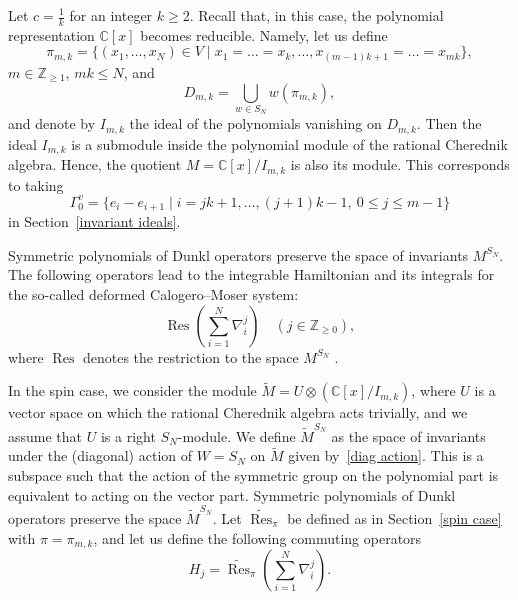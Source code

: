 \documentclass[12pt]{amsart}
\newcommand{\Z}{\mathbb Z}
\DeclareMathOperator{\Res}{Res}
\numberwithin{equation}{section}
\theoremstyle{definition}
\begin{document}
Let $c = \frac{1}{k}$ for an integer $k \geq 2$. Recall that, in this case, the polynomial representation $\mathbb{C}[x]$ becomes reducible. Namely, let us define 
\begin{equation*}
    \pi_{m,k} = \{(x_1, \dots, x_N) \in V \mid x_{1}= \dots = x_{k},  \ldots ,  x_{(m-1)k + 1}= \dots = x_{mk}  \},
\end{equation*}
$m \in \Z_{\geq 1}$, $mk \leq N$, 
and %
\begin{equation}
\label{strata}
    D_{m, k} = \underset{w \in S_N}{\bigcup} w(\pi_{m, k}),
\end{equation}
and denote by $I_{m ,k}$ the ideal of the polynomials vanishing on $D_{m,k}$.
Then the ideal $I_{m, k}$ is a submodule inside the polynomial module of the rational Cherednik algebra. Hence, the quotient $M = \mathbb{C}[x]/I_{m, k}$ is also its module. This corresponds to taking 
\begin{equation*}
    \Gamma_0^v = \{ e_i - e_{i+1} \mid i = jk+1, \dots, (j+1)k -1, \ 0 \leq j \leq m-1 \}
\end{equation*}
in Section~\ref{invariant ideals}.

Symmetric polynomials of Dunkl 
operators preserve the space of invariants $M^{S_N}$. The following operators lead to the integrable Hamiltonian and its integrals for the so-called deformed Calogero--Moser system:
\begin{equation*}
    \Res \left(\sum\limits_{i = 1}^N \nabla_{i}^j\right) \quad (j \in \mathbb{Z}_{\geq 0}), 
\end{equation*}
where $\Res$ denotes the restriction to the space $M^{S_N}$ \cite{Feigin}.

In the spin case, we consider the module $\widetilde{M} = U \otimes (\mathbb{C}[x]/I_{m, k})$, where $U$ is a vector space on which the rational Cherednik algebra acts trivially, and we assume that $U$ is a right $S_N$-module.  
We define $\widetilde{M}^{S_N}$ as the space of invariants under the (diagonal) action of $W = S_N$ on $\widetilde M$ given by~\eqref{diag action}.
This is a subspace such that the action of the symmetric group on the polynomial part is equivalent to acting 
on the vector part. Symmetric polynomials of Dunkl operators preserve the space
$\widetilde{M}^{S_N}$. 
Let $\widetilde{\Res}_\pi$ be defined as in Section~\ref{spin case} with $\pi = \pi_{m,k}$,
and let us define the 
following commuting operators
\begin{equation*}
    H_j = \widetilde{\Res}_\pi \left(\sum\limits_{i = 1}^N \nabla_i^j\right).
\end{equation*}
\end{document}
